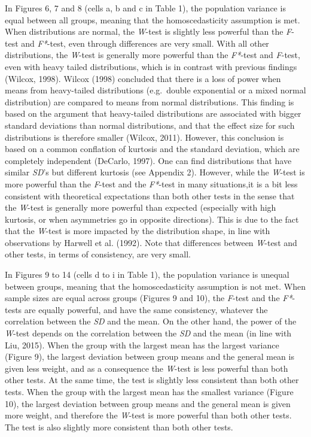 \documentclass[man,floatsintext]{apa6}
\begin{document}
In Figures 6, 7 and 8 (cells a, b and c in Table 1), the population variance is equal between all groups, meaning that the homoscedasticity assumption is met. When distributions are normal, the \emph{W}-test is slightly less powerful than the \emph{F}-test and \emph{F*}-test, even through differences are very small. With all other distributions, the \emph{W}-test is generally more powerful than the \emph{F*}-test and \emph{F}-test, even with heavy tailed distributions, which is in contrast with previous findings (Wilcox, 1998). Wilcox (1998) concluded that there is a loss of power when means from heavy-tailed distributions (e.g.~double exponential or a mixed normal distribution) are compared to means from normal distributions. This finding is based on the argument that heavy-tailed distributions are associated with bigger standard deviations than normal distributions, and that the effect size for such distributions is therefore smaller (Wilcox, 2011). However, this conclusion is based on a common conflation of kurtosis and the standard deviation, which are completely independent (DeCarlo, 1997). One can find distributions that have similar \emph{SD}'s but different kurtosis (see Appendix 2). However, while the \emph{W}-test is more powerful than the \emph{F}-test and the \emph{F*}-test in many situations,it is a bit less consistent with theoretical expectations than both other tests in the sense that the \emph{W}-test is generally more powerful than expected (especially with high kurtosis, or when asymmetries go in opposite directions). This is due to the fact that the \emph{W}-test is more impacted by the distribution shape, in line with observations by Harwell et al. (1992). Note that differences between \emph{W}-test and other tests, in terms of consistency, are very small.

In Figures 9 to 14 (cells d to i in Table 1), the population variance is unequal between groups, meaning that the homoscedasticity assumption is not met. When sample sizes are equal across groups (Figures 9 and 10), the \emph{F}-test and the \emph{F*}-tests are equally powerful, and have the same consistency, whatever the correlation between the \emph{SD} and the mean. On the other hand, the power of the \emph{W}-test depends on the correlation between the \emph{SD} and the mean (in line with Liu, 2015). When the group with the largest mean has the largest variance (Figure 9), the largest deviation between group means and the general mean is given less weight, and as a consequence the \emph{W}-test is less powerful than both other tests. At the same time, the test is slightly less consistent than both other tests. When the group with the largest mean has the smallest variance (Figure 10), the largest deviation between group means and the general mean is given more weight, and therefore the \emph{W}-test is more powerful than both other tests. The test is also slightly more consistent than both other tests.
\end{document}
